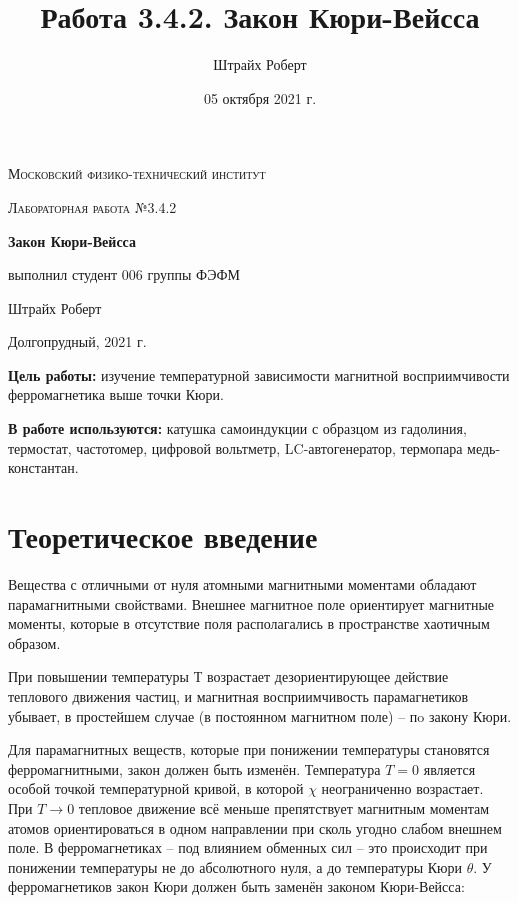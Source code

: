 \documentclass[a4paper, 12pt]{article}
\author{Штрайх Роберт}
\title{Работа 3.4.2. Закон Кюри-Вейсса}
\date{05 октября 2021 г.}
\begin{document}
\begin{titlepage}
	\centering
	\vspace{5cm}
	{\scshape\LARGE Московский физико-технический институт \par}
	\vspace{4cm}
	{\scshape\Large Лабораторная работа №3.4.2 \par}
	\vspace{1cm}
	{\huge\bfseries Закон Кюри-Вейсса\par}
	\vspace{1cm}
	\vfill
\begin{flushright}
	{\Large выполнил студент 006 группы ФЭФМ}\par
	\vspace{0.3cm}
	{\Large Штрайх Роберт}
\end{flushright}
	

	\vfill

	Долгопрудный, 2021 г.
\end{titlepage}

\newpage

\textbf{Цель работы:} изучение температурной зависимости магнитной восприимчивости ферромагнетика выше точки Кюри.

\textbf{В работе используются:} катушка самоиндукции с образцом из гадолиния, термостат, частотомер, цифровой вольтметр, LC-автогенератор, термопара медь-константан.

\section{Теоретическое введение}

Вещества с отличными от нуля атомными магнитными моментами обладают парамагнитными свойствами. Внешнее магнитное поле ориентирует магнитные моменты, которые в отсутствие поля располагались в пространстве хаотичным образом.

При повышении температуры $ Т $ возрастает дезориентирующее действие теплового движения частиц, и магнитная восприимчивость парамагнетиков
убывает, в простейшем случае (в постоянном магнитном
поле) -- пo закону Кюри.

Для парамагнитных веществ, которые при понижении температуры становятся ферромагнитными, закон должен быть изменён. Температура $T = 0$ является особой точкой температурной кривой, в которой $\chi$ неограниченно возрастает. При $T \to 0$ тепловое движение всё меньше препятствует магнитным моментам атомов ориентироваться в одном направлении при сколь угодно слабом внешнем поле. В ферромагнетиках -- под влиянием обменных сил -- это происходит при понижении температуры не до абсолютного нуля, а до температуры Кюри $\theta$. У ферромагнетиков закон Кюри должен быть заменён законом Кюри-Вейсса:
\end{document}
